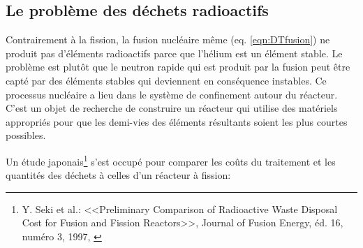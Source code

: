 \documentclass[12pt,a4paper]{article}
\begin{document}
\subsection{Le problème des déchets radioactifs}
%
%
%
%
%
%
%
%
%
%

Contrairement à la fission, la fusion nucléaire même (eq. \ref{eqn:DTfusion}) ne produit pas d'éléments radioactifs parce que l'hélium est un élément stable. Le problème est plutôt que le neutron rapide qui est produit par la fusion peut être capté par des éléments stables qui deviennent en conséquence instables. Ce processus nucléaire a lieu dans le système de confinement autour du réacteur. C'est un objet de recherche de construire un réacteur qui utilise des matériels appropriés pour que les demi-vies des éléments résultants soient les plus courtes possibles.

Un étude japonais\footnote{Y. Seki et al.: <<Preliminary Comparison of Radioactive Waste Disposal Cost
for Fusion and Fission Reactors>>, Journal of Fusion Energy, éd. 16, numéro 3, 1997, \cite{seki}} s'est occupé pour comparer les coûts du traitement et les quantités des déchets à celles d'un réacteur à fission: 
\end{document}
